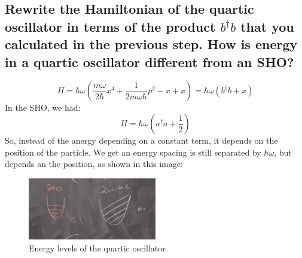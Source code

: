 \documentclass[12pt]{article}
\begin{document}
\subsection{Rewrite the Hamiltonian of the quartic oscillator in terms of the product \( b^\dagger b \) that you calculated in the previous step. How is energy in a quartic oscillator different from an SHO?}
\begin{equation}
    H = \hbar \omega \left(\frac{m\omega}{2\hbar}x^4 + \frac{1}{2m\omega\hbar}p^2 -x+x \right)= \hbar \omega \left(b^{\dagger}b +x\right)
\end{equation}
In the SHO, we had:
\begin{equation}
    H = \hbar \omega \left(a^{\dagger}a +\frac{1}{2}\right)
\end{equation}
So, instead of the anergy depending on a constant term, it depends on the position of the particle.
We get an energy spacing is still separated by $\hbar \omega$, but depends an the position, as shown in this image:
\begin{figure}[h]
    \centering
    \includegraphics[width=0.5\textwidth]{quartic.png}
    \caption{Energy levels of the quartic oscillator}
    \label{fig:mesh1}
\end{figure}
\end{document}
